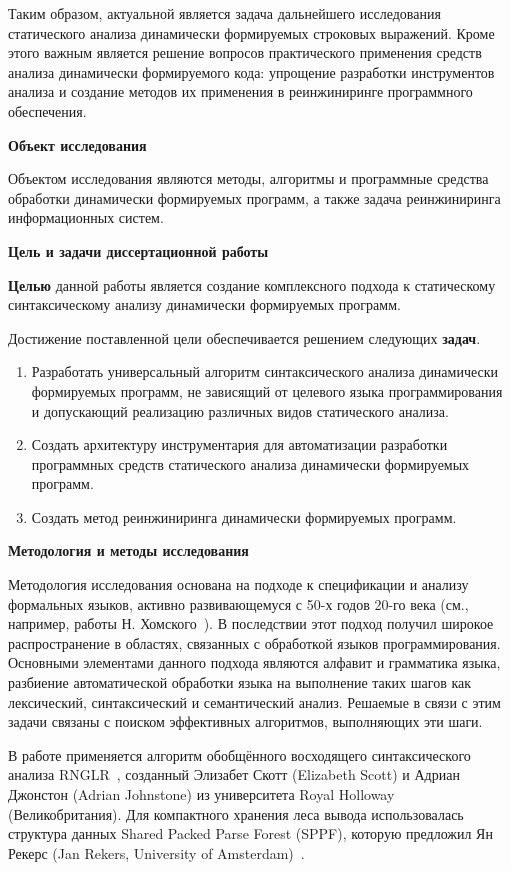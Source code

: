 Таким образом, актуальной является задача дальнейшего исследования статического анализа динамически формируемых строковых выражений. Кроме этого важным является решение вопросов практического применения средств анализа динамически формируемого кода: упрощение разработки инструментов анализа и создание методов их применения в реинжиниринге программного обеспечения.

\textbf{Объект исследования}

Объектом исследования являются методы, алгоритмы и программные средства обработки динамически формируемых программ, а также задача реинжиниринга информационных систем.

\textbf{Цель и задачи диссертационной работы}

\textbf{Целью} данной работы является создание комплексного подхода к статическому синтаксическому анализу динамически формируемых программ.

Достижение поставленной цели обеспечивается решением следующих \textbf{задач}.
\begin{enumerate}
    \item Разработать универсальный алгоритм синтаксического анализа динамически формируемых программ, не зависящий от целевого языка программирования и допускающий реализацию различных видов статического анализа. 
    \item Создать архитектуру инструментария для автоматизации разработки программных средств статического анализа динамически формируемых программ.
    \item Создать метод реинжиниринга динамически формируемых программ.
\end{enumerate}

\textbf{Методология и методы исследования}

Методология исследования основана на подходе к спецификации и анализу формальных языков, активно развивающемуся с 50-х годов 20-го века (см., например, работы Н. Хомского~\cite{chomskyMethod ,chomskySyntactic}). В последствии этот подход получил широкое распространение в областях, связанных с обработкой языков программирования.
Основными элементами данного подхода являются алфавит и грамматика языка, разбиение автоматической обработки языка на выполнение таких шагов как лексический, синтаксический и семантический анализ. Решаемые в связи с этим задачи связаны с поиском эффективных алгоритмов, выполняющих эти шаги. 

В работе применяется алгоритм обобщённого восходящего синтаксического анализа RNGLR~\cite{RNGLR}, созданный Элизабет Скотт (Elizabeth Scott) и Адриан Джонстон (Adrian Johnstone) из университета Royal Holloway (Великобритания). Для компактного хранения леса вывода использовалась структура данных Shared Packed Parse Forest (SPPF), которую предложил Ян Рекерс (Jan Rekers, University of Amsterdam)~\cite{SPPF}.

